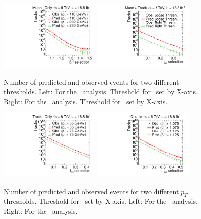\begin{figure}
\centering
  \includegraphics[clip=true, trim=0.0cm 0cm 2.4cm 0cm, width=0.44\textwidth]{figures/muonly/Prediction_Data8TeV_NPredVsNObs}
  \includegraphics[clip=true, trim=0.0cm 0cm 2.8cm 0cm,width=0.44\textwidth]{figures/tkmu/Prediction_Data8TeV_NPredVsNObs}
  \caption[Number of predicted and observed events for two different thresholds in the \muononly\ and \tktof\ analyses.]
{Number of predicted and observed events for two different thresholds. 
Left: For the \muononly\ analysis. Threshold for \invbeta\ set by X-axis.
Right: For the \tkonly\ analysis. Threshold for \ias\ set by X-axis.}
    \label{fig:PredPt230}
\end{figure}

\begin{figure}
\centering
  \includegraphics[clip=true, trim=0.0cm 0cm 2.8cm 0cm,width=0.44\textwidth]{figures/tkonly/Prediction_Data8TeV_NPredVsNObs}
  \includegraphics[clip=true, trim=0.0cm 0cm 2.8cm 0cm, width=0.44\textwidth]{figures/multi/Prediction_Data8TeV_NPredVsNObs}
  \caption[Number of predicted and observed events for two different thresholds in the \tkonly\ and \multi\ analyses.]
{Number of predicted and observed events for two different $p_T$ thresholds. Threshold for \ias\ set by X-axis.
Left: For the \multi\ analysis. Right: For the \tkonly\ analysis.}
    \label{fig:PredMF}
\end{figure}

